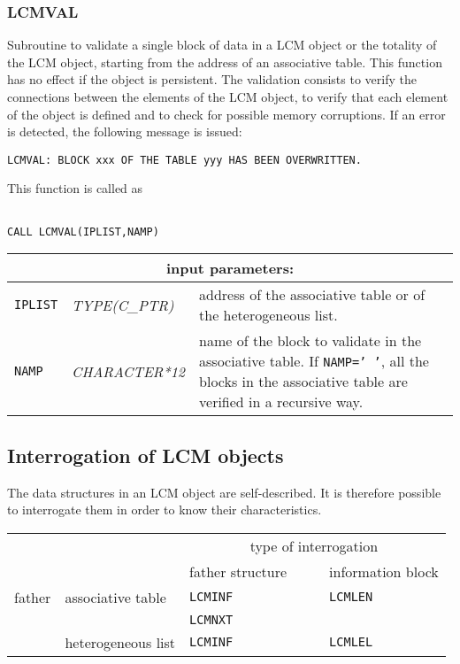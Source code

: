\subsubsection{LCMVAL}

Subroutine to validate a single block of data in a LCM object or the totality of the LCM object,
starting from the address of an associative table. This function has no effect if the object is
persistent. The validation consists to verify the connections between the elements of the LCM
object, to verify that each element of the object is defined and to check for possible memory corruptions.
If an error is detected, the following message is issued:

\begin{verbatim}
LCMVAL: BLOCK xxx OF THE TABLE yyy HAS BEEN OVERWRITTEN.
\end{verbatim}

This function is called as

\begin{verbatim}

CALL LCMVAL(IPLIST,NAMP)
\end{verbatim}

\noindent
\begin{tabular}{|p{1.5cm}|p{3cm}|p{10cm}|}
\hline
\multicolumn{3}{|c|}{\bf input parameters:} \\
\hline
{\tt IPLIST} & {\it TYPE(C\_PTR)} & address of the associative table or of the heterogeneous list. \\
\hline
{\tt NAMP} & {\it CHARACTER*12} & name of the block to validate in the associative table. 
If {\tt NAMP='~'}, all the blocks in the associative table are verified in a recursive way. \\
\hline
\end{tabular}

\subsection{Interrogation of LCM objects}

The data structures in an LCM object are self-described. It is therefore possible to
interrogate them in order to know their characteristics.

\vskip 0.4cm

\begin{center}
\begin{tabular}{|c|l|l|l|}
\cline{3-4}
\multicolumn{2}{c|}{} & \multicolumn{2}{c|}{type of interrogation} \\
\cline{3-4}
\multicolumn{2}{c|}{} & father structure~~~~  & information block \\
\hline
father & associative table & {\tt LCMINF} & {\tt LCMLEN} \\
       &                   & {\tt LCMNXT} &              \\
\cline{2-4}
       & heterogeneous list  & {\tt LCMINF} & {\tt LCMLEL} \\
\hline
\end{tabular}
\end{center}

